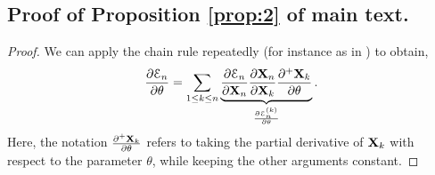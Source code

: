 \documentclass{article} \usepackage{iclr2022_conference,times}
\newcommand{\bX}{{\bf X}}
\newcommand{\E}{\EuScript{E}}
\begin{document}
\subsection{Proof of Proposition \ref{prop:2} of main text.}
\label{app:hsgubpf}
\begin{proof}


We can apply the chain rule repeatedly (for instance as in \cite{vanish_grad}) to obtain,
\begin{equation}
\label{eq:grad2}
\frac{\partial \E_n}{\partial \theta} = \sum\limits_{1 \leq k \leq n} \underbrace{\frac{\partial \E_n}{\partial \bX_n} \frac{\partial \bX_n}{\partial \bX_k} \frac{\partial^{+} \bX_k}{\partial \theta}}_{\frac{\partial \E^{(k)}_n}{\partial \theta}}.
\end{equation}
Here, the notation $\frac{\partial^{+} \bX_k}{\partial \theta}$ refers to taking the partial derivative of $\bX_k$ with respect to the parameter $\theta$, while keeping the other arguments constant.


\end{proof}
\end{document}
